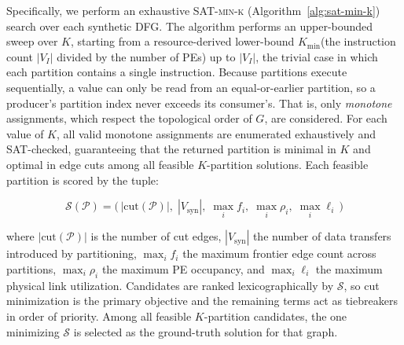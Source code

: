 \documentclass[runningheads]{llncs}
\begin{document}
Specifically, we perform an exhaustive \textsc{SAT-min-k} (Algorithm~\ref{alg:sat-min-k}) search %
over each synthetic DFG. The algorithm performs an upper-bounded sweep over $K$, starting from a resource-derived lower-bound $K_{\min}$(the instruction count $|V_I|$ divided by the number of PEs) up to $|V_I|$, the trivial case in which each partition contains a single instruction. Because partitions execute sequentially, a value can only be read from an equal-or-earlier partition, so a producer's partition index never exceeds its consumer's.
%
That is, only \emph{monotone} assignments, which respect
the topological order of $G$, are considered.
For each value of $K$, all valid monotone assignments are enumerated exhaustively and SAT-checked, guaranteeing that the returned partition is minimal in $K$ and optimal in edge cuts among all feasible $K$-partition solutions.
%
%
%
Each feasible %
partition is scored by the tuple:

\begin{equation}
    \mathcal{S}(\mathcal{P}) = \bigl(\,|\text{cut}(\mathcal{P})|,\; |V_{\text{syn}}|,\; \max_i f_i,\; \max_i \rho_i,\; \max_i \ell_i\,\bigr)
    \label{eq:score}
\end{equation}

\noindent where $|\text{cut}(\mathcal{P})|$ is the number of cut edges, $|V_{\text{syn}}|$ the number of 
data transfers introduced by partitioning, $\max_i f_i$ the maximum frontier edge count across partitions, $\max_i \rho_i$ the maximum PE occupancy, and $\max_i \ell_i$ the maximum physical link utilization. Candidates are ranked lexicographically by $\mathcal{S}$, so cut minimization is the primary objective and the remaining terms act as tiebreakers in order of priority. Among all feasible $K$-partition candidates, the one minimizing $\mathcal{S}$ is selected as the ground-truth solution for that graph.
\end{document}
